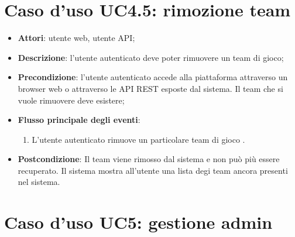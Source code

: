 \section{Caso d'uso UC4.5: rimozione team}
\begin{itemize}
\item \textbf{Attori}: utente web, utente API;
\item \textbf{Descrizione}: l'utente autenticato deve poter rimuovere un team di gioco; 
      \item \textbf{Precondizione}: l'utente autenticato accede alla piattaforma attraverso un browser web o attraverso le API REST esposte dal sistema. Il team che si vuole rimuovere deve esistere;

        \item \textbf{Flusso principale degli eventi}:
          \begin{enumerate}
          \item L'utente autenticato rimuove un particolare team di gioco	.

      \end{enumerate}
    \item \textbf{Postcondizione}: Il team viene rimosso dal sistema e non può più essere recuperato. Il sistema mostra all'utente una lista degi team ancora presenti nel sistema.
  \end{itemize}
\hypertarget{UC5}{}
\section{Caso d'uso UC5: gestione admin}


